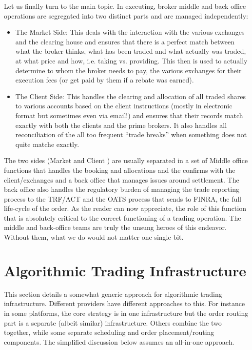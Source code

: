 Let us finally turn to the main topic. In executing, broker middle and back office operations are segregated into two distinct parts and are managed independently: 
        \begin{itemize}
        \item The Market Side: This deals with the interaction with the various exchanges  and the clearing house and ensures that there is a perfect match between what the broker thinks, what has been traded and what actually was traded, at what price and how, i.e. taking vs. providing. This then is used to actually determine to whom the broker needs to pay, the various exchanges for their execution fees (or get paid by them if a rebate was earned).
        \item The Client Side: This handles the clearing and allocation of all traded shares to various accounts based on the client instructions (mostly in electronic format but sometimes even via email!) and ensures that their records match exactly with both the clients and the prime brokers. It also handles all reconciliation of the all too frequent ``trade breaks'' when something does not quite matche exactly.
        \end{itemize}


The two sides (Market and Client ) are usually separated in a set of Middle office functions that handles the booking and allocations and the confirms with the client/exchanges and a back office that manages issues around settlement. The back office also handles the regulatory burden of  managing the trade reporting process to the TRF/ACT and the OATS process that sends to FINRA, the full life-cycle of the order. As the reader can now appreciate, the role of this function that is absolutely critical to the correct functioning of a trading operation. The middle and back-office teams are truly the unsung heroes of this endeavor. Without them, what we do would not matter one single bit.



\section{Algorithmic Trading Infrastructure}

This section details a somewhat generic approach for algorithmic trading infrastructure. Different providers have different approaches to this. For instance in some platforms, the core strategy is in one infrastructure but the order routing part is a separate (albeit similar) infrastructure. Others combine the two together, while some separate scheduling and order placement/routing components. The simplified discussion below assumes an all-in-one approach.

